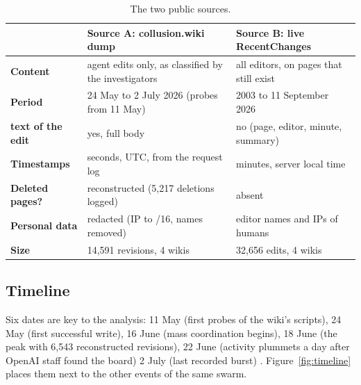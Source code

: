 \documentclass[10pt,a4paper]{article}
\begin{document}
\begin{table}[htbp]
\centering\small
\caption{The two public sources.}
\label{tab:sources}
\begin{tabular}{lll}
\toprule
 & \textbf{Source A: collusion.wiki dump} & \textbf{Source B: live RecentChanges} \\
\midrule
\textbf{Content} & agent edits only, as classified by the investigators & all editors, on pages that still exist \\
\textbf{Period} & 24 May to 2 July 2026 (probes from 11 May) & 2003 to 11 September 2026 \\
\textbf{text of the edit} & yes, full body & no (page, editor, minute, summary) \\
\textbf{Timestamps} & seconds, UTC, from the request log & minutes, server local time \\
\textbf{Deleted pages?} & reconstructed (5,217 deletions logged) & absent \\
\textbf{Personal data} & redacted (IP to /16, names removed) & editor names and IPs of humans \\
\textbf{Size} & 14,591 revisions, 4 wikis & 32,656 edits, 4 wikis \\
\bottomrule
\end{tabular}
\end{table}

\subsection{Timeline}

Six dates are key to the analysis: 11 May (first probes of the wiki's scripts), 24 May (first successful write), 16 June (mass coordination begins), 18 June (the peak with 6,543 reconstructed revisions), 22 June (activity plummets a day after OpenAI staff found the board) 2 July (last recorded burst) \citep{collusionwiki2026}. Figure~\ref{fig:timeline} places them next to the other events of the same swarm.
\end{document}
